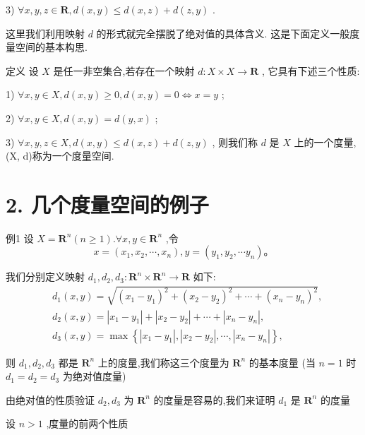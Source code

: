 3) $\forall x,y,z \in  \mathbf{R},d\left( {x,y}\right)  \leq  d\left( {x,z}\right)  + d\left( {z,y}\right)$ .

这里我们利用映射 $d$ 的形式就完全摆脱了绝对值的具体含义. 这是下面定义一般度量空间的基本构思.

定义 设 $X$ 是任一非空集合,若存在一个映射 $d : X \times  X \rightarrow  \mathbf{R}$ , 它具有下述三个性质:

1) $\forall x,y \in  X,d\left( {x,y}\right)  \geq  0,d\left( {x,y}\right)  = 0 \Leftrightarrow  x = y$ ;

2) $\forall x,y \in  X,d\left( {x,y}\right)  = d\left( {y,x}\right)$ ;

3) $\forall x,y,z \in  X,d\left( {x,y}\right)  \leq  d\left( {x,z}\right)  + d\left( {z,y}\right)$ , 则我们称 $d$ 是 $X$ 上的一个度量,(X, d)称为一个度量空间.

\section*{2. 几个度量空间的例子}

例1 设 $X = {\mathbf{R}}^{n}\left( {n \geq  1}\right) .\forall x,y \in  {\mathbf{R}}^{n}$ ,令
$$x = \left( {{x}_{1},{x}_{2},\cdots ,{x}_{n}}\right) ,y = \left( {{y}_{1},{y}_{2},\cdots {y}_{n}}\right) 。$$

我们分别定义映射 ${d}_{1},{d}_{2},{d}_{3} : {\mathbf{R}}^{n} \times  {\mathbf{R}}^{n} \rightarrow  \mathbf{R}$ 如下:
\begin{align*}
	&{d}_{1}\left( {x,y}\right)  = \sqrt{{\left( {x}_{1} - {y}_{1}\right) }^{2} + {\left( {x}_{2} - {y}_{2}\right) }^{2} + \cdots  + {\left( {x}_{n} - {y}_{n}\right) }^{2}},\\
	&{d}_{2}\left( {x,y}\right)  = \left| {{x}_{1} - {y}_{1}}\right|  + \left| {{x}_{2} - {y}_{2}}\right|  + \cdots  + \left| {{x}_{n} - {y}_{n}}\right| ,\\
	&{d}_{3}\left( {x,y}\right)  = \max \left\{  {\left| {{x}_{1} - {y}_{1}}\right| ,\left| {{x}_{2} - {y}_{2}}\right| ,\cdots ,\left| {{x}_{n} - {y}_{n}}\right| }\right\}  ,
\end{align*}

则 ${d}_{1},{d}_{2},{d}_{3}$ 都是 ${\mathbf{R}}^{n}$ 上的度量,我们称这三个度量为 ${\mathbf{R}}^{n}$ 的基本度量 (当 $n = 1$ 时 ${d}_{1} = {d}_{2} = {d}_{3}$ 为绝对值度量)

由绝对值的性质验证 ${d}_{2},{d}_{3}$ 为 ${\mathbf{R}}^{n}$ 的度量是容易的,我们来证明 ${d}_{1}$ 是 ${\mathbf{R}}^{n}$ 的度量

设 $n > 1$ ,度量的前两个性质

